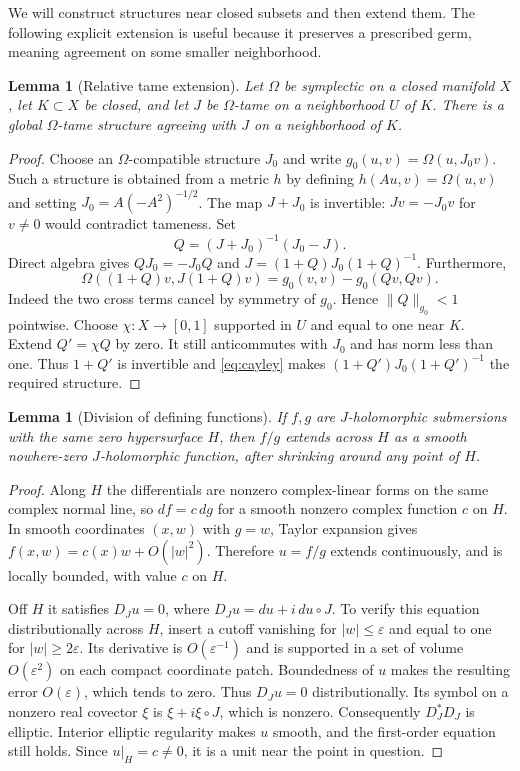 \documentclass[11pt]{article}
\newtheorem{lemma}[theorem]{Lemma}
\theoremstyle{definition}
\theoremstyle{remark}
\begin{document}
We will construct structures near closed subsets and then extend them. The following explicit extension is useful because it preserves a prescribed germ, meaning agreement on some smaller neighborhood.

\begin{lemma}[Relative tame extension]\label{lem:extension}
Let $\Omega$ be symplectic on a closed manifold $X$, let $K\subset X$ be closed, and let $J$ be $\Omega$-tame on a neighborhood $U$ of $K$. There is a global $\Omega$-tame structure agreeing with $J$ on a neighborhood of $K$.
\end{lemma}
\begin{proof}
Choose an $\Omega$-compatible structure $J_0$ and write
$g_0(u,v)=\Omega(u,J_0v)$. Such a structure is obtained from a metric $h$ by defining $h(Au,v)=\Omega(u,v)$ and setting
$J_0=A(-A^2)^{-1/2}$.
The map $J+J_0$ is invertible: $Jv=-J_0v$ for $v\ne0$ would contradict tameness. Set
\[
 Q=(J+J_0)^{-1}(J_0-J).
\]
Direct algebra gives $QJ_0=-J_0Q$ and
$J=(1+Q)J_0(1+Q)^{-1}$. Furthermore,
\begin{equation}\label{eq:cayley}
 \Omega((1+Q)v,J(1+Q)v)=g_0(v,v)-g_0(Qv,Qv).
\end{equation}
Indeed the two cross terms cancel by symmetry of $g_0$. Hence $\|Q\|_{g_0}<1$ pointwise. Choose $\chi:X\to[0,1]$ supported in $U$ and equal to one near $K$. Extend $Q'=\chi Q$ by zero. It still anticommutes with $J_0$ and has norm less than one. Thus $1+Q'$ is invertible and \eqref{eq:cayley} makes
$(1+Q')J_0(1+Q')^{-1}$ the required structure.
\end{proof}

\begin{lemma}[Division of defining functions]\label{lem:division}
If $f,g$ are $J$-holomorphic submersions with the same zero hypersurface $H$, then $f/g$ extends across $H$ as a smooth nowhere-zero $J$-holomorphic function, after shrinking around any point of $H$.
\end{lemma}
\begin{proof}
Along $H$ the differentials are nonzero complex-linear forms on the same complex normal line, so $df=c\,dg$ for a smooth nonzero complex function $c$ on $H$. In smooth coordinates $(x,w)$ with $g=w$, Taylor expansion gives
$f(x,w)=c(x)w+O(|w|^2)$. Therefore $u=f/g$ extends continuously, and is locally bounded, with value $c$ on $H$.

Off $H$ it satisfies $D_Ju=0$, where $D_Ju=du+i\,du\circ J$. To verify this equation distributionally across $H$, insert a cutoff vanishing for $|w|\leq\varepsilon$ and equal to one for $|w|\geq2\varepsilon$. Its derivative is $O(\varepsilon^{-1})$ and is supported in a set of volume $O(\varepsilon^2)$ on each compact coordinate patch. Boundedness of $u$ makes the resulting error $O(\varepsilon)$, which tends to zero. Thus $D_Ju=0$ distributionally. Its symbol on a nonzero real covector $\xi$ is $\xi+i\xi\circ J$, which is nonzero. Consequently $D_J^*D_J$ is elliptic. Interior elliptic regularity makes $u$ smooth, and the first-order equation still holds. Since $u|_H=c\ne0$, it is a unit near the point in question.
\end{proof}
\end{document}
